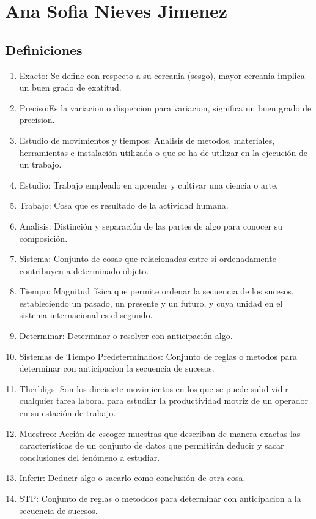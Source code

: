 \section{Ana Sofia Nieves Jimenez}
\subsection{Definiciones}

\begin{enumerate}
    \item Exacto: Se define con respecto a su cercania (sesgo), mayor cercania implica un buen grado de exatitud.
    \item Preciso:Es la variacion o dispercion para variacion, significa un buen grado de precision.
    \item Estudio de movimientos y tiempos: Analisis de metodos, materiales, herramientas e instalación utilizada o que se ha de utilizar en la ejecución de un trabajo.
    \item Estudio: Trabajo empleado en aprender y cultivar una ciencia o arte.
    \item Trabajo: Cosa que es resultado de la actividad humana.
    \item Analisis: Distinción y separación de las partes de algo para conocer su composición. 
    \item Sistema: Conjunto de cosas que relacionadas entre sí ordenadamente contribuyen a determinado objeto.
    \item Tiempo: Magnitud física que permite ordenar la secuencia de los sucesos, estableciendo un pasado, un presente y un futuro, y cuya unidad en el sistema internacional es el segundo.
    \item Determinar: Determinar o resolver con anticipación algo.
    \item Sistemas de Tiempo Predeterminados: Conjunto de reglas o metodos para determinar con anticipacion la secuencia de 
    sucesos.
    \item Therbligs:  Son los diecisiete movimientos en los que se puede subdividir cualquier tarea laboral para estudiar la productividad motriz de un operador en su estación de trabajo.
    \item Muestreo:  Acción de escoger muestras que describan de manera exactas las características de un conjunto de datos que permitirán deducir y sacar conclusiones del fenómeno a estudiar.
    \item Inferir: Deducir algo o sacarlo como conclusión de otra cosa.
    \item STP: Conjunto de reglas o metoddos para determinar con anticipacion a la secuencia de sucesos.

\end{enumerate}

